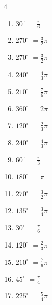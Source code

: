 \begin{multicols}{4}
\begin{enumerate}
  \item $\displaystyle 30^{\circ}$
        $\displaystyle =\frac{\pi}{6}$

  \item $\displaystyle 270^{\circ}$
        $\displaystyle =\frac{3}{2}\pi$

  \item $\displaystyle 270^{\circ}$
        $\displaystyle =\frac{3}{2}\pi$

  \item $\displaystyle 240^{\circ}$
        $\displaystyle =\frac{4}{3}\pi$

  \item $\displaystyle 210^{\circ}$
        $\displaystyle =\frac{7}{6}\pi$

  \item $\displaystyle 360^{\circ}$
        $\displaystyle =2\pi$

  \item $\displaystyle 120^{\circ}$
        $\displaystyle =\frac{2}{3}\pi$

  \item $\displaystyle 240^{\circ}$
        $\displaystyle =\frac{4}{3}\pi$

  \item $\displaystyle 60^{\circ}$
        $\displaystyle =\frac{\pi}{3}$

  \item $\displaystyle 180^{\circ}$
        $\displaystyle =\pi$

  \item $\displaystyle 270^{\circ}$
        $\displaystyle =\frac{3}{2}\pi$

  \item $\displaystyle 135^{\circ}$
        $\displaystyle =\frac{3}{4}\pi$

  \item $\displaystyle 30^{\circ}$
        $\displaystyle =\frac{\pi}{6}$

  \item $\displaystyle 120^{\circ}$
        $\displaystyle =\frac{2}{3}\pi$

  \item $\displaystyle 210^{\circ}$
        $\displaystyle =\frac{7}{6}\pi$

  \item $\displaystyle 45^{\circ}$
        $\displaystyle =\frac{\pi}{4}$

  \item $\displaystyle 225^{\circ}$
        $\displaystyle =\frac{5}{4}\pi$


\end{enumerate}
\end{multicols}
